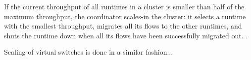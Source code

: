 If the current throughput of all runtimes in a cluster is smaller than half of the maximum throughput, the coordinator scales-in the cluster: it selects a runtime with the smallest throughput, migrates all its flows to the other runtimes, and shuts the runtime down when all its flows have been successfully migrated out. .






 Scaling of virtual switches is done in a similar fashion...




